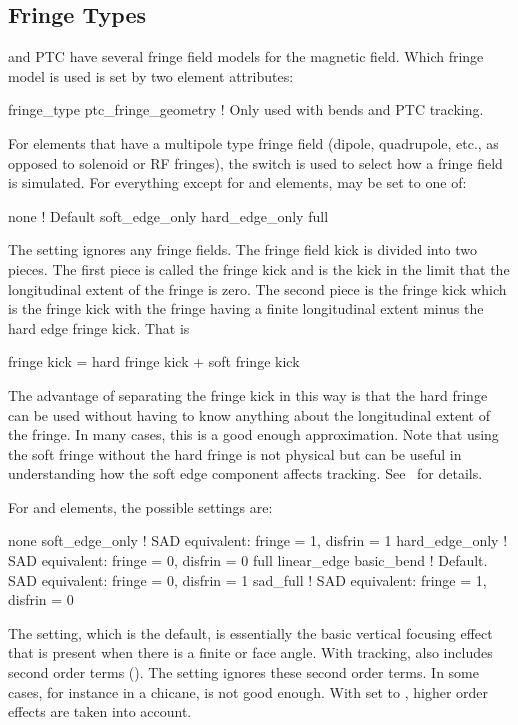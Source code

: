 {%
\subsection{Fringe Types}
\label{s:fringe.type}

\bmad and PTC have several fringe field models for the magnetic field. Which fringe
model is used is set by two element attributes:
\begin{example}
  fringe_type
  ptc_fringe_geometry   ! Only used with bends and PTC tracking.
\end{example}

For elements that have a multipole type fringe field (dipole, quadrupole, etc., as opposed to
solenoid or RF fringes), the  switch is used to select how a fringe field is
simulated.  For everything except for  and  elements,  may be
set to one of:
\begin{example}
  none              ! Default 
  soft_edge_only
  hard_edge_only
  full
\end{example}
The  setting ignores any fringe fields.  The fringe field kick is divided into two pieces.
The first piece is called the  fringe kick and is the kick in the limit that the
longitudinal extent of the fringe is zero. The second piece is the  fringe kick which
is the fringe kick with the fringe having a finite longitudinal extent minus the hard edge fringe
kick. That is
\begin{example}
  fringe kick = hard fringe kick + soft fringe kick
\end{example}
The advantage of separating the fringe kick in this way is that the hard fringe can be used without
having to know anything about the longitudinal extent of the fringe.  In many cases, this is a good
enough approximation. Note that using the soft fringe without the hard fringe is not physical but
can be useful in understanding how the soft edge component affects tracking. See~
for details.

For  and  elements, the possible 
settings are:
\begin{example}
  none
  soft_edge_only      !          SAD equivalent: fringe = 1, disfrin = 1
  hard_edge_only      !          SAD equivalent: fringe = 0, disfrin = 0
  full
  linear_edge
  basic_bend          ! Default. SAD equivalent: fringe = 0, disfrin = 1
  sad_full            !          SAD equivalent: fringe = 1, disfrin = 0
\end{example}
The  setting, which is the default, is essentially the basic vertical focusing effect
that is present when there is a finite  or  face angle. With 
tracking,  also includes second order terms (). The
 setting ignores these second order terms.  In some cases, for instance in a
chicane,  is not good enough. With  set to , higher order
effects are taken into account.

}
